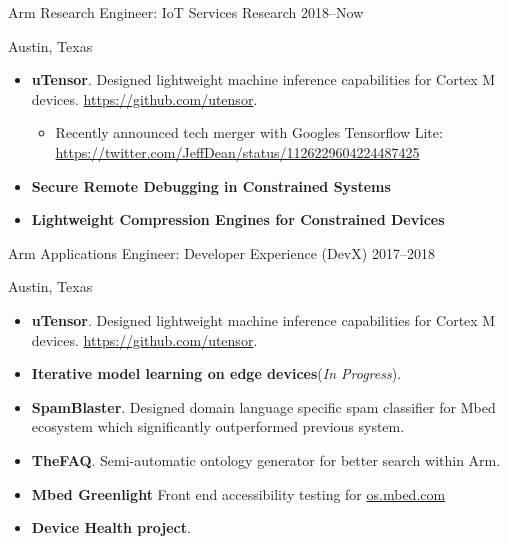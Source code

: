 \documentclass[]{friggeri-cv} %
\begin{document}
\begin{entrylist}


\entry
{Arm}
{Research Engineer: IoT Services Research}
{2018--Now}
{Austin, Texas \\
\begin{itemize}
\item \textbf{uTensor}. Designed lightweight machine inference capabilities for Cortex M devices. \url{https://github.com/utensor}.
    \begin{itemize}
    \item Recently announced tech merger with Googles Tensorflow Lite: \url{https://twitter.com/JeffDean/status/1126229604224487425}
    \end{itemize}
\item \textbf{Secure Remote Debugging in Constrained Systems}
\item \textbf{Lightweight Compression Engines for Constrained Devices}
\end{itemize} }


\entry
{Arm}
{Applications Engineer: Developer Experience (DevX)}
{2017--2018}
{Austin, Texas \\
\begin{itemize}
\item \textbf{uTensor}. Designed lightweight machine inference capabilities for Cortex M devices. \url{https://github.com/utensor}.
\item \textbf{Iterative model learning on edge devices}(\textit{In Progress}). 
\item \textbf{SpamBlaster}. Designed domain language specific spam classifier for Mbed ecosystem which significantly outperformed previous system. 
\item \textbf{TheFAQ}. Semi-automatic ontology generator for better search within Arm.
\item \textbf{Mbed Greenlight} Front end accessibility testing for \url{os.mbed.com}
\item \textbf{Device Health project}. 
\end{itemize} }


\end{entrylist}
\end{document}
